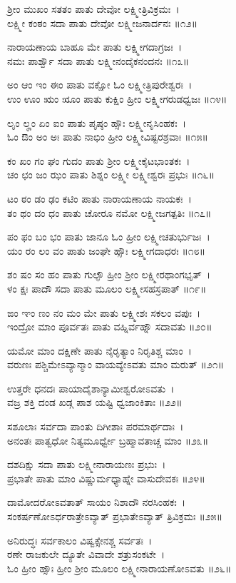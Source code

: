ಶ್ರೀಂ ಮುಖಂ ಸತತಂ ಪಾತು ದೇವೋ ಲಕ್ಷ್ಮೀತ್ರಿವಿಕ್ರಮಃ~।\\
ಲಕ್ಷ್ಮೀ ಕಂಠಂ ಸದಾ ಪಾತು ದೇವೋ ಲಕ್ಷ್ಮೀಜನಾರ್ದನಃ ॥೧೨॥

ನಾರಾಯಣಾಯ ಬಾಹೂ ಮೇ ಪಾತು ಲಕ್ಷ್ಮೀಗದಾಗ್ರಜಃ~।\\
ನಮಃ ಪಾರ್ಶ್ವೌ ಸದಾ ಪಾತು ಲಕ್ಷ್ಮೀನಂದೈಕನಂದನಃ ॥೧೩॥

ಅಂ ಆಂ ಇಂ ಈಂ ಪಾತು ವಕ್ಷೋ ಓಂ ಲಕ್ಷ್ಮೀತ್ರಿಪುರೇಶ್ವರಃ~।\\
ಉಂ ಊಂ ಋಂ ೠಂ ಪಾತು ಕುಕ್ಷಿಂ ಹ್ರೀಂ ಲಕ್ಷ್ಮೀಗರುಡಧ್ವಜಃ ॥೧೪॥

ಲೃಂ ಲೄಂ ಏಂ ಐಂ ಪಾತು ಪೃಷ್ಠಂ ಹ್ಸೌಃ ಲಕ್ಷ್ಮೀನೃಸಿಂಹಕಃ~।\\
ಓಂ ಔಂ ಅಂ ಅಃ ಪಾತು ನಾಭಿಂ ಹ್ರೀಂ ಲಕ್ಷ್ಮೀವಿಷ್ಟರಶ್ರವಾಃ ॥೧೫॥

ಕಂ ಖಂ ಗಂ ಘಂ ಗುದಂ ಪಾತು ಶ್ರೀಂ ಲಕ್ಷ್ಮೀಕೈಟಭಾಂತಕಃ~।\\
ಚಂ ಛಂ ಜಂ ಝಂ ಪಾತು ಶಿಶ್ನಂ ಲಕ್ಷ್ಮೀ ಲಕ್ಷ್ಮೀಶ್ವರಃ ಪ್ರಭುಃ ॥೧೬॥

ಟಂ ಠಂ ಡಂ ಢಂ ಕಟಿಂ ಪಾತು ನಾರಾಯಣಾಯ ನಾಯಕಃ~।\\
ತಂ ಥಂ ದಂ ಧಂ ಪಾತು ಚೋರೂ ನಮೋ ಲಕ್ಷ್ಮೀಜಗತ್ಪತಿಃ ॥೧೭॥

ಪಂ ಫಂ ಬಂ ಭಂ ಪಾತು ಜಾನೂ ಓಂ ಹ್ರೀಂ ಲಕ್ಷ್ಮೀಚತುರ್ಭುಜಃ~।\\
ಯಂ ರಂ ಲಂ ವಂ ಪಾತು ಜಂಘೇ ಹ್ಸೌಃ ಲಕ್ಷ್ಮೀಗದಾಧರಃ ॥೧೮॥

ಶಂ ಷಂ ಸಂ ಹಂ ಪಾತು ಗುಲ್ಫೌ ಹ್ರೀಂ ಶ್ರೀಂ ಲಕ್ಷ್ಮೀರಥಾಂಗಭೃತ್~।\\
ಳಂ ಕ್ಷಃ ಪಾದೌ ಸದಾ ಪಾತು ಮೂಲಂ ಲಕ್ಷ್ಮೀಸಹಸ್ರಪಾತ್ ॥೧೯॥

ಙಂ ಞಂ ಣಂ ನಂ ಮಂ ಮೇ ಪಾತು ಲಕ್ಷ್ಮೀಶಃ ಸಕಲಂ ವಪುಃ~।\\
ಇಂದ್ರೋ ಮಾಂ ಪೂರ್ವತಃ ಪಾತು ವಹ್ನಿರ್ವಹ್ನೌ ಸದಾವತು ॥೨೦॥

ಯಮೋ ಮಾಂ ದಕ್ಷಿಣೇ ಪಾತು ನೈರೃತ್ಯಾಂ ನಿರೃತಿಶ್ಚ ಮಾಂ~।\\
ವರುಣಃ ಪಶ್ಚಿಮೇಽವ್ಯಾನ್ಮಾಂ ವಾಯವ್ಯೇಽವತು ಮಾಂ ಮರುತ್ ॥೨೧॥

ಉತ್ತರೇ ಧನದಃ ಪಾಯಾದೈಶಾನ್ಯಾಮೀಶ್ವರೋಽವತು~।\\
ವಜ್ರ ಶಕ್ತಿ ದಂಡ ಖಡ್ಗ ಪಾಶ ಯಷ್ಟಿ ಧ್ವಜಾಂಕಿತಾಃ ॥೨೨॥

ಸಶೂಲಾಃ ಸರ್ವದಾ ಪಾಂತು ದಿಗೀಶಾಃ ಪರಮಾರ್ಥದಾಃ~।\\
ಅನಂತಃ ಪಾತ್ವಧೋ ನಿತ್ಯಮೂರ್ಧ್ವೇ ಬ್ರಹ್ಮಾವತಾಚ್ಚ ಮಾಂ ॥೨೩॥

ದಶದಿಕ್ಷು ಸದಾ ಪಾತು ಲಕ್ಷ್ಮೀನಾರಾಯಣಃ ಪ್ರಭುಃ~।\\
ಪ್ರಭಾತೇ ಪಾತು ಮಾಂ ವಿಷ್ಣುರ್ಮಧ್ಯಾಹ್ನೇ ವಾಸುದೇವಕಃ ॥೨೪॥

ದಾಮೋದರೋಽವತಾತ್ ಸಾಯಂ ನಿಶಾದೌ ನರಸಿಂಹಕಃ~।\\
ಸಂಕರ್ಷಣೋಽರ್ಧರಾತ್ರೇಽವ್ಯಾತ್ ಪ್ರಭಾತೇಽವ್ಯಾತ್ ತ್ರಿವಿಕ್ರಮಃ ॥೨೫॥

ಅನಿರುದ್ಧಃ ಸರ್ವಕಾಲಂ ವಿಷ್ವಕ್ಸೇನಶ್ಚ ಸರ್ವತಃ~।\\
ರಣೇ ರಾಜಕುಲೇ ದ್ಯೂತೇ ವಿವಾದೇ ಶತ್ರುಸಂಕಟೇ~।\\
ಓಂ ಹ್ರೀಂ ಹ್ಸೌಃ ಹ್ರೀಂ ಶ್ರೀಂ ಮೂಲಂ ಲಕ್ಷ್ಮೀನಾರಾಯಣೋಽವತು ॥೨೬॥

